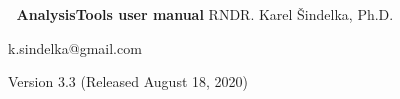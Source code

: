 
\makeatletter
\def\@makechapterhead#1{
  {\parindent \z@ \raggedright \normalfont
   \vspace*{30pt}
   \Huge\bfseries \thechapter. #1
   \par\nobreak
   \vskip 20\p@
}}
\def\@makeschapterhead#1{
  {\parindent \z@ \raggedright \normalfont
   \Huge\bfseries #1
   \par\nobreak
   \vskip 20\p@
}}
\makeatother %
\def\chapwithtoc#1{
\chapter*{#1}
\addcontentsline{toc}{chapter}{#1}
} %

\setcounter{secnumdepth}{2}
\setcounter{tocdepth}{2}

\setcounter{topnumber}{2}
\setcounter{bottomnumber}{2}
\setcounter{totalnumber}{4}
\renewcommand{\topfraction}{0.9}
\renewcommand{\bottomfraction}{0.8}
\renewcommand{\textfraction}{0.07}
\renewcommand{\floatpagefraction}{0.7}

\let\tt\useless
\newcommand{\tt}{\texttt}
\newcommand{\vcf}{\texttt{vcf} }
\newcommand{\vsf}{\texttt{vsf} }
\newcommand{\vscf}{\texttt{vsf/vcf} }
\newcommand{\vtf}{\texttt{vtf} }
\newcommand{\field}{\texttt{FIELD} }
\newcommand{\data}{\texttt{data} }
\newcommand{\ttb}[1]{\textcolor{blue}{\texttt{#1}}}

\newcommand{\note}[1]{\vspace{-1em}\noindent\footnotesize{#1}}
\newcommand{\TODO}{\colorbox{yellow}{TODO:}}




\begin{center}
\thispagestyle{empty}
\textcolor{white}{.}
\vfill
\vfill
\vfill
{\Huge\bf AnalysisTools user manual}
\vfill
{\Large RNDR. Karel Šindelka, Ph.D.}

{\small k.sindelka@gmail.com}
\vspace{10pt}

\vfill
Version 3.3 (Released August 18, 2020)
\vfill
\vfill
\vfill
\vfill
\vfill
\end{center}

\pagestyle{main}
\tableofcontents

\setcounter{page}{1}







